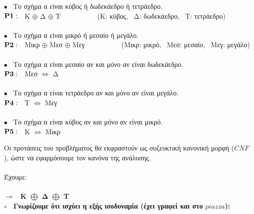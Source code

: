 \documentclass[10pt]{article}
\begin{document}
$\bullet$ \ Το σχήμα α είναι κύβος ή δωδεκάεδρο ή τετράεδρο. \\

\hspace{20mm}$\bf P1: \ \ \normalfont$ K $\oplus$ Δ $\oplus$ Τ    \ \ \ \ \ \ \ \ \ \ (Κ: κύβος, \ Δ: δωδεκάεδρο, \ Τ: τετράεδρο)\\  \\

$\bullet$ \ Το σχήμα α είναι μικρό ή μεσαίο ή μεγάλο. \\ 

\hspace{20mm}$\bf P2: \ \ \normalfont$ Μικρ $\oplus$ Μεσ $\oplus$ Μεγ    \ \ \ \ \ \ \ \ \ \ (Μικρ: μικρό, \ Μεσ: μεσαίο, \ Μεγ: μεγάλο)\\  \\

$\bullet$ \ Το σχήμα α είναι μεσαίο αν και μόνο αν είναι δωδεκάεδρο. \\ 

\hspace{20mm}$\bf P3: \ \ \normalfont$ Μεσ $\Leftrightarrow$ Δ\\  \\

$\bullet$ \ Το σχήμα α είναι τετράεδρο αν και μόνο αν είναι μεγάλο.
 \\ 

\hspace{20mm}$\bf P4: \ \ \normalfont$ Τ $\Leftrightarrow$ Μεγ\\  \\

$\bullet$ \ Το σχήμα α είναι κύβος αν και μόνο αν είναι μικρό. \\ 

\hspace{20mm}$\bf P5: \ \ \normalfont$ Κ $\Leftrightarrow$ Μικρ 

\vspace{10mm}

Οι προτάσεις του προβλήματος θα εκφραστούν ως συζευκτική κανονική μορφή ($CNF$), ώστε να εφαρμόσουμε τον κανόνα της ανάλυσης. \\ \\

Έχουμε: \\ \\

$\rightharpoonup$ \ \bf K $\bigoplus$ Δ $\bigoplus$ Τ \normalfont \\

$\circ$ \ Γνωρίζουμε ότι ισχύει η εξής ισοδυναμία (έχει γραφεί και στο $piazza$):
\end{document}
